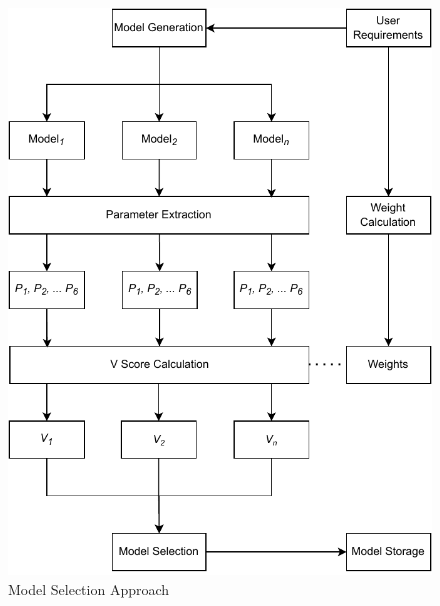 \documentclass[a4paper,fleqn]{cas-dc}
\begin{document}
\begin{figure}[H]
    \centering
    \includegraphics[width=1.4\columnwidth]{math_model_relaxed.pdf}
    \caption{Model Selection Approach}
    \label{fig:model_selection_approach}
\end{figure}
\end{document}
